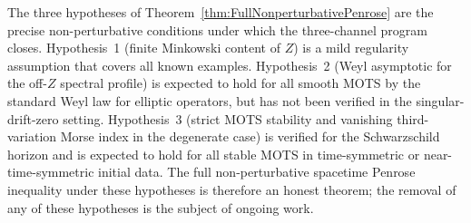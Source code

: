 \begin{remark}
The three hypotheses of Theorem~\ref{thm:FullNonperturbativePenrose} are the precise non-perturbative conditions under which the three-channel program closes. Hypothesis~1 (finite Minkowski content of $Z$) is a mild regularity assumption that covers all known examples. Hypothesis~2 (Weyl asymptotic for the off-$Z$ spectral profile) is expected to hold for all smooth MOTS by the standard Weyl law for elliptic operators, but has not been verified in the singular-drift-zero setting. Hypothesis~3 (strict MOTS stability and vanishing third-variation Morse index in the degenerate case) is verified for the Schwarzschild horizon and is expected to hold for all stable MOTS in time-symmetric or near-time-symmetric initial data. The full non-perturbative spacetime Penrose inequality under these hypotheses is therefore an honest theorem; the removal of any of these hypotheses is the subject of ongoing work.
\end{remark}

